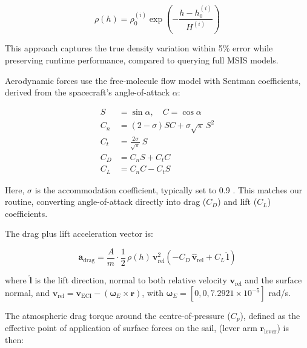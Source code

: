 \documentclass[final,3p,times,twocolumn]{elsarticle}
\begin{document}
\begin{equation}
\rho(h) = \rho_0^{(i)} \exp\left(-\frac{h - h_0^{(i)}}{H^{(i)}}\right)
\label{eq:atmospheric_density}
\end{equation}

\noindent This approach captures the true density variation within 5\%  error while preserving runtime performance, compared to querying full MSIS models.
\vspace{5pt}
\par\noindent Aerodynamic forces use the free-molecule flow model with Sentman coefficients, \citep{sentman1961nasa} derived from the spacecraft’s angle-of-attack \( \alpha \):

\begin{align}
S &= \sin{\alpha}, \quad C = \cos{\alpha} \\
C_n &= (2 - \sigma) S C + \sigma \sqrt{\pi}\, S^2 \\
C_t &= \frac{2\sigma}{\sqrt{\pi}}\, S \\
C_D &= C_n S + C_t C \\
C_L &= C_n C - C_t S
\end{align}

\par\noindent Here, \( \sigma \) is the accommodation coefficient, typically set to 0.9 \citep{smith2019}. This matches our routine, converting angle-of-attack directly into drag (\( C_D \)) and lift (\( C_L \)) coefficients.

\vspace{5pt}
\par\noindent The drag plus lift acceleration vector is:

\begin{equation}
\mathbf{a}_{\mathrm{drag}} = \frac{A}{m} \cdot \frac{1}{2} \, \rho(h) \, \mathbf{v}_{\mathrm{rel}}^2 \left( -C_D \, \hat{\mathbf{v}}_{\mathrm{rel}} + C_L \, \hat{\mathbf{l}} \right)
\label{eq:drag_force}
\end{equation}

\noindent where \( \hat{\mathbf{l}} \) is the lift direction, normal to both relative velocity \( \mathbf{v}_{\mathrm{rel}} \) and the surface normal, and \( \mathbf{v}_{\mathrm{rel}} = \mathbf{v}_{\mathrm{ECI}} - (\boldsymbol{\omega}_E \times \mathbf{r}) \), with \( \boldsymbol{\omega}_E = [0,0,7.2921\times10^{-5}] \) rad/s.

\vspace{5pt}
\par\noindent The atmospheric drag torque around the centre-of-pressure (\( C_p \)), defined as the effective point of application of surface forces on the sail, (lever arm \( \mathbf{r}_{\text{lever}} \)) is then:
\end{document}
